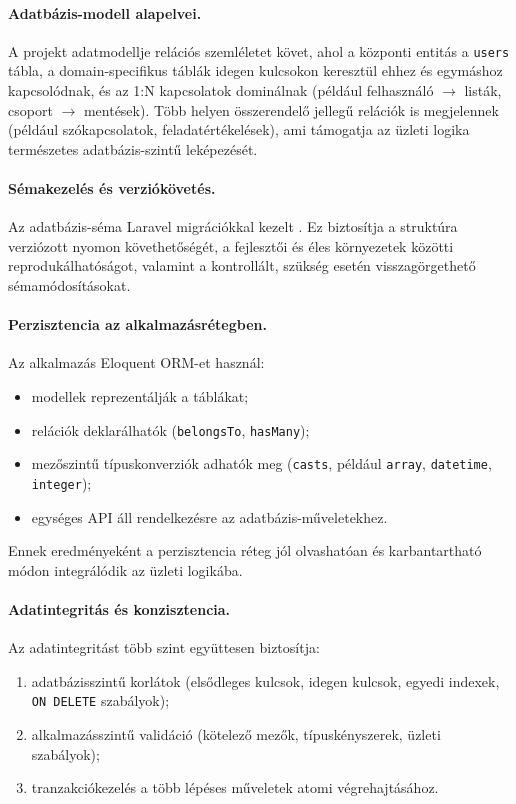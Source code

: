 \documentclass{thesis-ekf}
\begin{document}
\paragraph{Adatbázis-modell alapelvei.}
A projekt adatmodellje relációs szemléletet követ, ahol a központi entitás a \texttt{users} tábla, a domain-specifikus táblák idegen kulcsokon keresztül ehhez és egymáshoz kapcsolódnak, és az 1:N kapcsolatok dominálnak (például felhasználó $\rightarrow$ listák, csoport $\rightarrow$ mentések). Több helyen összerendelő jellegű relációk is megjelennek (például szókapcsolatok, feladatértékelések), ami támogatja az üzleti logika természetes adatbázis-szintű leképezését.

\paragraph{Sémakezelés és verziókövetés.}
Az adatbázis-séma Laravel migrációkkal kezelt \cite{laravel}. Ez biztosítja a struktúra verziózott nyomon követhetőségét, a fejlesztői és éles környezetek közötti reprodukálhatóságot, valamint a kontrollált, szükség esetén visszagörgethető sémamódosításokat.

\paragraph{Perzisztencia az alkalmazásrétegben.}
Az alkalmazás Eloquent ORM-et \cite{eloquent-orm} használ:
\begin{itemize}
  \item modellek reprezentálják a táblákat;
  \item relációk deklarálhatók (\texttt{belongsTo}, \texttt{hasMany});
  \item mezőszintű típuskonverziók adhatók meg (\texttt{casts}, például \texttt{array}, \texttt{datetime},\\ \texttt{integer});
  \item egységes API áll rendelkezésre az adatbázis-műveletekhez.
\end{itemize}

Ennek eredményeként a perzisztencia réteg jól olvashatóan és karbantartható módon integrálódik az üzleti logikába.

\paragraph{Adatintegritás és konzisztencia.}
Az adatintegritást több szint együttesen biztosítja:
\begin{enumerate}
  \item adatbázisszintű korlátok (elsődleges kulcsok, idegen kulcsok, egyedi indexek, \texttt{ON DELETE} szabályok);
  \item alkalmazásszintű validáció (kötelező mezők, típuskényszerek, üzleti szabályok);
  \item tranzakciókezelés a több lépéses műveletek atomi végrehajtásához.
\end{enumerate}
\end{document}
